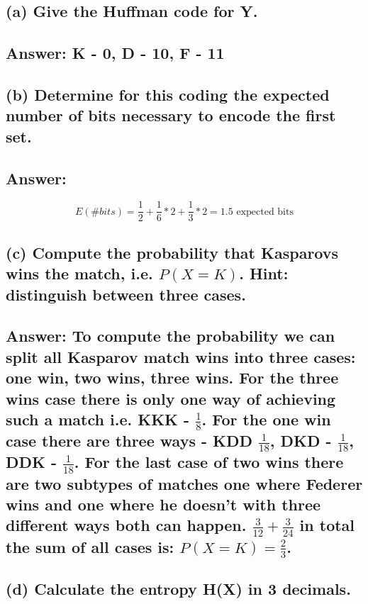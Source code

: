 \documentclass[11px]{article}
\begin{document}
\subsection*{\normalfont (a) Give the Huffman code for Y.}

\subsection*{Answer: K - 0, D - 10, F - 11}

\subsection*{\normalfont (b) Determine for this coding the expected number of bits necessary to encode the first set.}

\subsection*{Answer: }

\begin{equation}
E(\#bits) = \frac{1}{2} + \frac{1}{6}*2 + \frac{1}{3}*2 = 1.5 \text{ expected bits}
\end{equation}

\subsection*{\normalfont (c) Compute the probability that Kasparovs wins the match, i.e. \(P(X = K)\). Hint: distinguish between three cases.}

\subsection*{Answer: To compute the probability we can split all Kasparov match wins into three cases: one win, two wins, three wins. For the three wins case there is only one way of achieving such a match i.e. KKK - \(\frac{1}{8}\). For the one win case there are three ways - KDD \(\frac{1}{18}\), DKD - \(\frac{1}{18}\), DDK - \(\frac{1}{18}\). For the last case of two wins there are two subtypes of matches one where Federer wins and one where he doesn't with three different ways both can happen. \(\frac{3}{12}+\frac{3}{24}\) in total the sum of all cases is: \(P(X = K) = \frac{2}{3}\).}

\subsection*{\normalfont (d) Calculate the entropy H(X) in 3 decimals.}
\end{document}
